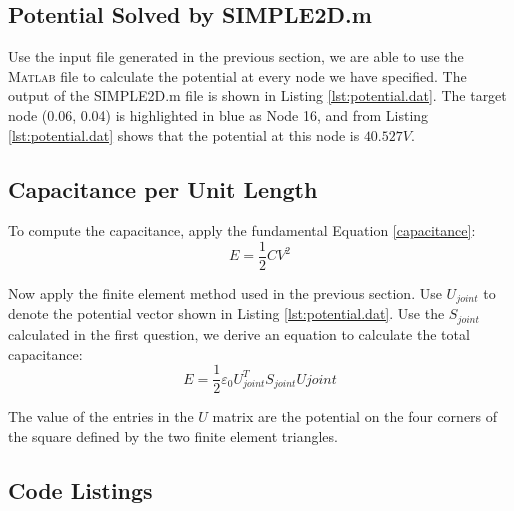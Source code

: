 \documentclass[a4paper,titlepage]{article}
\newcommand{\MATLAB}{\textsc{Matlab}\xspace}
\begin{document}
		\subsection{Potential Solved by SIMPLE2D.m}
			Use the input file generated in the previous section, we are able to use the \MATLAB file to calculate the potential at every node we have specified. The output of the SIMPLE2D.m file is shown in Listing \ref{lst:potential.dat}. The target node (0.06, 0.04) is highlighted in blue as Node 16, and from Listing \ref{lst:potential.dat} shows that the potential at this node is $40.527V$.
			
		\subsection{Capacitance per Unit Length}
			To compute the capacitance, apply the fundamental Equation \ref{capacitance}: 
			\begin{equation}
				E = \frac{1}{2} CV^2
				\label{capacitance}
			\end{equation}
			
			Now apply the finite element method used in the previous section. Use $U_{joint}$ to denote the potential vector shown in Listing \ref{lst:potential.dat}. Use the $S_{joint}$ calculated in the first question, we derive an equation to calculate the total capacitance:
			\begin{equation}
				E = \frac{1}{2}\varepsilon_0 U^T_{joint}S_{joint}U{joint}
			\end{equation}
			
			The value of the entries in the $U$ matrix are the potential on the four corners of the square defined by the two finite element triangles.
	\newpage
	\begin{appendices}
		
		\section{Code Listings} \label{appendix:code}
		
		
		\begin{center}
			\inputminted{python}{../finite_element.py}
			\label{lst:finite_element}
		\end{center}
		
		\newpage
		\twocolumn
		\begin{center}
			\inputminted{python}{../SIMPLE2Dinput.dat}
			\label{lst:SIMPLE2D.dat}
		\end{center}
	
		\begin{center}
			\captionof{listing}{\MATLAB File Outputs}
			\inputminted{python}{../potentials.dat}
			\label{lst:potential.dat}
		\end{center}
		\newpage
		
	\end{appendices}
	
\end{document}
